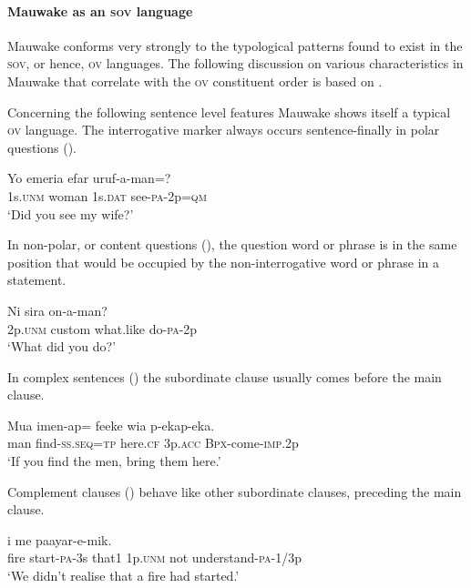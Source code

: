 \paragraph{Mauwake as an \textsc{sov} language} \label{sec:1.4.2.2}
Mauwake conforms very strongly to the typological patterns found to exist in the \textsc{sov}, or hence, \textsc{ov} languages.  The following discussion on various characteristics in Mauwake that correlate with the \textsc{ov} constituent order is based on \citet{Dryer2007a}.

Concerning the following sentence level features Mauwake shows itself a typical \textsc{ov} language.  The interrogative marker   always occurs sentence-finally in polar questions ().

\ea%
\label{ex:1:x672}
\gll Yo  emeria  efar  uruf-a-man=? \\
1s.\textsc{unm} woman  1s.\textsc{dat}  see-\textsc{pa}-2p=\textsc{qm}     \\
\glt`Did you see my wife?'
\z


In non-polar, or content questions (), the question word or phrase is in the same position that would be occupied by the non-interrogative word or phrase in a statement.

\ea%
\label{ex:1:x673}
\gll Ni  sira   on-a-man? \\
2p.\textsc{unm}  custom  what.like  do-\textsc{pa}-2p      \\
\glt`What did you do?'
\z


In complex sentences () the subordinate clause usually comes before the main clause.

\ea%
\label{ex:1:x674}
\gll Mua  imen-ap=  feeke  wia  p-ekap-eka. \\
 man  find-\textsc{ss}.\textsc{seq}=\textsc{tp}  here.\textsc{cf}  3p.\textsc{acc}  \textsc{Bpx}-come-\textsc{imp}.2p     \\
\glt`If you find the men, bring them here.'
\z


Complement clauses () behave like other subordinate clauses, preceding the main clause. 

\ea%
\label{ex:1:x675}
\gll {}     i  me  paayar-e-mik. \\
fire  start-\textsc{pa}-3s  that1  1p.\textsc{unm}  not  understand-\textsc{pa}-1/3p      \\
\glt`We didn't realise that a fire had started.'
\z


